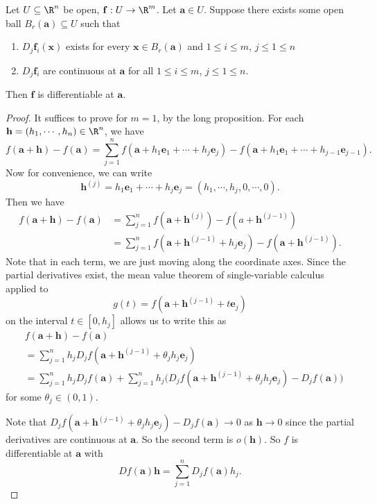 \documentclass[a4paper]{article}
\begin{document}
\begin{thm}
  Let $U\subseteq \R^n$ be open, $\mathbf{f}: U \to \R^m$. Let $\mathbf{a} \in U$. Suppose there exists some open ball $B_r(\mathbf{a}) \subseteq U$ such that
  \begin{enumerate}
    \item $D_j \mathbf{f}_i(\mathbf{x})$ exists for every $\mathbf{x} \in B_r(\mathbf{a})$ and $1 \leq i \leq m$, $j \leq 1 \leq n$
    \item $D_j \mathbf{f}_i$ are continuous at $\mathbf{a}$ for all $1 \leq i \leq m$, $j \leq 1 \leq n$.
  \end{enumerate}
  Then $\mathbf{f}$ is differentiable at $\mathbf{a}$.
\end{thm}

\begin{proof}
  It suffices to prove for $m = 1$, by the long proposition. For each $\mathbf{h} = (h_1, \cdots, h_n) \in \R^n$, we have
  \[
    f(\mathbf{a} + \mathbf{h}) - f(\mathbf{a}) = \sum_{j = 1}^n f(\mathbf{a} + h_1 \mathbf{e}_1 + \cdots + h_j \mathbf{e}_j) - f(\mathbf{a} + h_1 \mathbf{e}_1 + \cdots + h_{j - 1} \mathbf{e}_{j - 1}).
  \]
  Now for convenience, we can write
  \[
    \mathbf{h}^{(j)} = h_1 \mathbf{e}_1 + \cdots + h_j \mathbf{e}_j = (h_1, \cdots, h_j, 0, \cdots, 0).
  \]
  Then we have
  \begin{align*}
    f(\mathbf{a} + \mathbf{h}) - f(\mathbf{a}) &= \sum_{j = 1}^n f(\mathbf{a} + \mathbf{h}^{(j)}) - f(a + \mathbf{h}^{(j - 1)}) \\
    &= \sum_{j = 1}^n f(\mathbf{a} + \mathbf{h}^{(j - 1)} + h_j \mathbf{e}_j) - f(\mathbf{a} + \mathbf{h}^{(j - 1)}).
  \end{align*}
  Note that in each term, we are just moving along the coordinate axes. Since the partial derivatives exist, the mean value theorem of single-variable calculus applied to
  \[
    g(t) = f(\mathbf{a} + \mathbf{h}^{(j - 1)} + t \mathbf{e}_j)
  \]
  on the interval $t \in [0, h_j]$ allows us to write this as
  \begin{align*}
    &f(\mathbf{a} + \mathbf{h}) - f(\mathbf{a}) \\
    &= \sum_{j = 1}^n h_j D_j f (\mathbf{a} + \mathbf{h}^{(j - 1)} + \theta_j h_j \mathbf{e}_j)\\
    &= \sum_{j = 1}^n h_j D_j f(\mathbf{a}) + \sum_{j = 1}^n h_j \Big(D_j f (\mathbf{a} + \mathbf{h}^{(j - 1)} + \theta_j h_j \mathbf{e}_j) - D_j f(\mathbf{a})\Big)
  \end{align*}
  for some $\theta_j \in (0, 1)$.

  Note that $D_j f (\mathbf{a} + \mathbf{h}^{(j - 1)} + \theta_j h_j \mathbf{e}_j) - D_j f(\mathbf{a}) \to 0$ as $\mathbf{h} \to 0$ since the partial derivatives are continuous at $\mathbf{a}$. So the second term is $o(\mathbf{h})$. So $f$ is differentiable at $\mathbf{a}$ with
  \[
    D f (\mathbf{a})\mathbf{h}= \sum_{j = 1}^n D_j f (\mathbf{a})h_j.
  \]
\end{proof}
\end{document}
